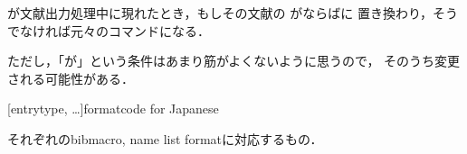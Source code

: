 \documentclass[lualatex,ja=standard,magstyle=real]{bxjsarticle}
\begin{document}
\begin{ltxsyntax}

  が文献出力処理中に現れたとき，もしその文献の
  がならばに
  置き換わり，そうでなければ元々のコマンドになる．

  ただし，「が」という条件はあまり筋がよくないように思うので，
  そのうち変更される可能性がある．


  [entrytype, \dots]{format}{code for Japanese}

  それぞれのbibmacro, name list formatに対応するもの．
\end{ltxsyntax}
\end{document}
